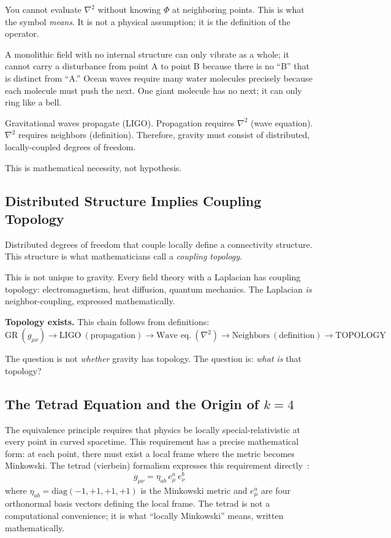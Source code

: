 \documentclass[aps,prd,preprint,superscriptaddress,showpacs,preprintnumbers,amsmath,amssymb,nofootinbib]{revtex4-2}
\begin{document}
You cannot evaluate $\nabla^2$ without knowing $\Phi$ at neighboring points. This is what the symbol \emph{means}. It is not a physical assumption; it is the definition of the operator.

A monolithic field with no internal structure can only vibrate as a whole; it cannot carry a disturbance from point A to point B because there is no ``B'' that is distinct from ``A.'' Ocean waves require many water molecules precisely because each molecule must push the next. One giant molecule has no next; it can only ring like a bell.

Gravitational waves propagate (LIGO). Propagation requires $\nabla^2$ (wave equation). $\nabla^2$ requires neighbors (definition). Therefore, gravity must consist of distributed, locally-coupled degrees of freedom.

This is mathematical necessity, not hypothesis.

\subsection{Distributed Structure Implies Coupling Topology}
\label{subsec:topology}

Distributed degrees of freedom that couple locally define a connectivity structure. This structure is what mathematicians call a \emph{coupling topology}.

This is not unique to gravity. Every field theory with a Laplacian has coupling topology: electromagnetism, heat diffusion, quantum mechanics. The Laplacian \emph{is} neighbor-coupling, expressed mathematically.

\textbf{Topology exists.} This chain follows from definitions:
\begin{equation*}
\text{GR}~(g_{\mu\nu}) \rightarrow \text{LIGO}~(\text{propagation}) \rightarrow \text{Wave eq.}~(\nabla^2) \rightarrow \text{Neighbors}~(\text{definition}) \rightarrow \text{TOPOLOGY}
\end{equation*}

The question is not \emph{whether} gravity has topology. The question is: \emph{what is} that topology?

\subsection{The Tetrad Equation and the Origin of \texorpdfstring{$k=4$}{k=4}}
\label{subsec:tetrad}

The equivalence principle requires that physics be locally special-relativistic at every point in curved spacetime. This requirement has a precise mathematical form: at each point, there must exist a local frame where the metric becomes Minkowski. The tetrad (vierbein) formalism expresses this requirement directly~\cite{mtw1973,wald1984}:
\begin{equation}
g_{\mu\nu} = \eta_{ab}\, e^a_\mu\, e^b_\nu
\label{eq:tetrad}
\end{equation}
where $\eta_{ab} = \text{diag}(-1, +1, +1, +1)$ is the Minkowski metric and $e^a_\mu$ are four orthonormal basis vectors defining the local frame. The tetrad is not a computational convenience; it is what ``locally Minkowski'' means, written mathematically.
\end{document}

